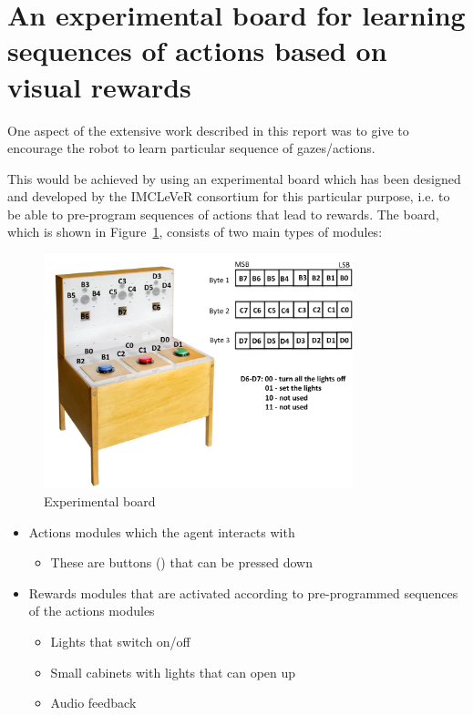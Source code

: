 \section{An experimental board for learning sequences of actions based on visual rewards}
\label{sec:serial_experimental_board}

One aspect of the extensive work described in this report was to give to encourage the robot to learn particular sequence of gazes/actions.

This would be achieved by using an experimental board which has been designed and developed by the IMCLeVeR consortium for this particular purpose, i.e. to be able to pre-program sequences of actions that lead to rewards. The board, which is shown in Figure~\ref{fig:experimental_board}, consists of two main types of modules:

\begin{figure}[htb]
\begin{center}
\includegraphics[width=0.8\textwidth]{lights.jpg}
\end{center}
\caption{Experimental board}
\label{fig:experimental_board}
\end{figure}


\begin{itemize}
\item Actions modules which the agent interacts with
\begin{itemize}
\item These are buttons () that can be pressed down
\end{itemize}
\item Rewards modules that are activated according to pre-programmed sequences of the actions modules
\begin{itemize}
\item Lights that switch on/off
\item Small cabinets with lights that can open up
\item Audio feedback
\end{itemize}
\end{itemize}

